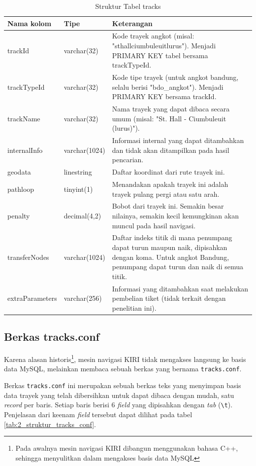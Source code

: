 \begin{table}
	\caption{Struktur Tabel tracks}
	\label{tab:2_struktur_tabel_tracks}
	\begin{tabular}{|p{3cm}|p{2.5cm}|p{9.5cm}|}
		\hline
		Nama kolom & Tipe & Keterangan \\
		\hline
		trackId & varchar(32) & Kode trayek angkot (misal: "sthallciumbuleuitlurus").
			Menjadi PRIMARY KEY tabel bersama trackTypeId. \\
		trackTypeId & varchar(32) & Kode tipe trayek (untuk angkot bandung,
			selalu berisi "bdo\_angkot"). Menjadi PRIMARY KEY bersama trackId. \\
		trackName & varchar(32) & Nama trayek yang dapat dibaca secara umum
			(misal: "St. Hall - Ciumbuleuit (lurus)"). \\
		internalInfo & varchar(1024) & Informasi internal yang dapat
			ditambahkan dan tidak akan ditampilkan pada hasil pencarian. \\
		geodata & linestring & Daftar koordinat dari rute trayek ini. \\
		pathloop & tinyint(1) & Menandakan apakah trayek ini adalah trayek
			pulang pergi atau satu arah. \\
		penalty & decimal(4,2) & Bobot dari trayek ini. Semakin besar nilainya,
			semakin kecil kemungkinan akan muncul pada hasil navigasi. \\
		transferNodes & varchar(1024) & Daftar indeks titik di mana penumpang
			dapat turun maupun naik, dipisahkan dengan koma. Untuk angkot
			Bandung, penumpang dapat turun dan naik di semua titik. \\
		extraParameters & varchar(256) & Informasi yang ditambahkan saat
		melakukan pembelian tiket (tidak terkait dengan penelitian ini). \\
		\hline
	\end{tabular}
\end{table}

\subsection{Berkas tracks.conf}
Karena alasan historis\footnote{Pada awalnya mesin navigasi KIRI dibangun
menggunakan bahasa C++, sehingga menyulitkan dalam mengakses basis data MySQL},
mesin navigasi KIRI tidak mengakses langsung ke basis data MySQL, melainkan
membaca sebuah berkas yang bernama \verb/tracks.conf/.

Berkas \verb/tracks.conf/ ini merupakan sebuah berkas teks yang menyimpan basis
data trayek yang telah dibersihkan untuk dapat dibaca dengan mudah, satu
\textit{record} per baris. Setiap baris berisi 6 \textit{field} yang dipisahkan
dengan \textit{tab} (\verb/\t/). Penjelasan dari keenam \textit{field} tersebut
dapat dilihat pada tabel \ref{tab:2_struktur_tracks_conf}.

